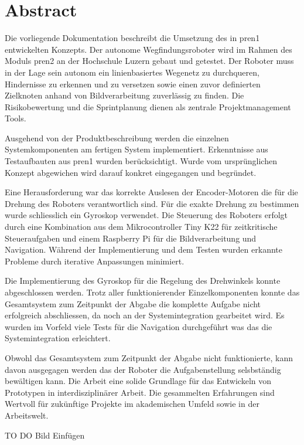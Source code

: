 \section*{Abstract}


Die vorliegende Dokumentation beschreibt die Umsetzung des in \acrfull{pren1} entwickelten Konzepts. Der autonome Wegfindungsroboter wird im Rahmen des Moduls \acrfull{pren2} an der Hochschule Luzern gebaut und getestet. Der Roboter muss in der Lage sein autonom ein linienbasiertes Wegenetz zu durchqueren, Hindernisse zu erkennen und zu versetzen sowie einen zuvor definierten Zielknoten anhand von Bildverarbeitung zuverlässig zu finden. Die Risikobewertung und die Sprintplanung dienen als zentrale Projektmanagement Tools.  

Ausgehend von der Produktbeschreibung werden die einzelnen Systemkomponenten am fertigen System implementiert. Erkenntnisse aus Testaufbauten aus \acrshort{pren1} wurden berücksichtigt. Wurde vom ursprünglichen Konzept abgewichen wird darauf konkret eingegangen und begründet. 

Eine Herausforderung war das korrekte Auslesen der Encoder-Motoren die für die Drehung des Roboters verantwortlich sind. Für die exakte Drehung zu bestimmen wurde schliesslich ein Gyroskop verwendet. Die Steuerung des Roboters erfolgt durch eine Kombination aus dem Mikrocontroller Tiny K22 für zeitkritische Steueraufgaben und einem Raspberry Pi für die Bildverarbeitung und Navigation. Während der Implementierung und dem Testen wurden erkannte Probleme durch iterative Anpassungen minimiert.


Die Implementierung des Gyroskop für die Regelung des Drehwinkels konnte abgeschlossen werden. Trotz aller funktionierender Einzelkomponenten konnte das Gesamtsystem zum Zeitpunkt der Abgabe die komplette Aufgabe nicht erfolgreich abschliessen, da noch an der Systemintegration gearbeitet wird. Es wurden im Vorfeld viele Tests für die Navigation durchgeführt was das die Systemintegration erleichtert.

Obwohl das Gesamtsystem zum Zeitpunkt der Abgabe nicht funktionierte, kann davon ausgegagen werden das der Roboter die Aufgabenstellung selsbständig bewältigen kann. Die Arbeit eine solide Grundlage für das Entwickeln von Prototypen in interdisziplinärer Arbeit. Die gesammelten Erfahrungen sind Wertvoll für zukünftige Projekte im akademischen Umfeld sowie in der Arbeitswelt.


TO DO Bild Einfügen

